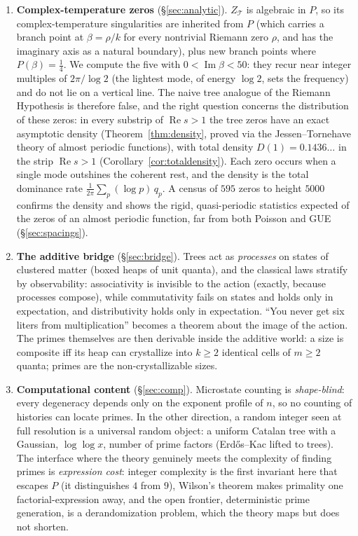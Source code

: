 \documentclass[11pt]{article}
\newcommand{\cT}{\mathcal{T}}   %
\numberwithin{equation}{section}
\theoremstyle{plain}
\theoremstyle{definition}
\theoremstyle{remark}
\begin{document}
\begin{enumerate}
\item \textbf{Complex-temperature zeros} (\S\ref{sec:analytic}). $Z_\cT$ is algebraic
in $P$, so its complex-temperature singularities are inherited from $P$ (which
carries a branch point at $\beta = \rho/k$ for every nontrivial Riemann zero $\rho$,
and has the imaginary axis as a natural boundary), plus new branch points where
$P(\beta) = \tfrac14$. We compute the five with $0 < \operatorname{Im}\beta < 50$:
they recur near integer multiples of $2\pi/\log 2$ (the lightest mode, of energy
$\log 2$, sets the frequency) and do not
lie on a vertical line. The naive tree analogue of the Riemann Hypothesis is
therefore false, and the right question concerns the distribution of these zeros: in
every substrip of $\operatorname{Re} s > 1$ the tree zeros
have an exact asymptotic density (Theorem~\ref{thm:density}, proved via the
Jessen--Tornehave theory of almost periodic functions), with total density
$D(1) = 0.1436\dots$ in the strip $\operatorname{Re} s > 1$
(Corollary~\ref{cor:totaldensity}). Each zero occurs when a single mode outshines the
coherent rest, and the density is the total dominance rate
$\frac{1}{2\pi}\sum_p (\log p)\, q_p$. A census of $595$ zeros to height $5000$
confirms the density and shows the rigid, quasi-periodic statistics expected of
the zeros of an almost periodic function, far from both Poisson and GUE
(\S\ref{sec:spacings}).

\item \textbf{The additive bridge} (\S\ref{sec:bridge}). Trees act as
\emph{processes} on states of clustered matter (boxed heaps of unit quanta), and the
classical laws stratify by observability: associativity is invisible to the action
(exactly, because processes compose), while commutativity fails on states and
holds only in expectation, and distributivity holds only in expectation. ``You never
get six liters from multiplication'' becomes a theorem about the image of the action.
The primes themselves are then derivable inside the additive world: a size is
composite iff its heap can crystallize into $k \ge 2$ identical cells of $m \ge 2$
quanta; primes are the non-crystallizable sizes.

\item \textbf{Computational content} (\S\ref{sec:comp}). Microstate counting is
\emph{shape-blind}: every
degeneracy depends only on the exponent profile of $n$, so no counting of histories
can locate primes. In the other direction, a
random integer seen at full resolution is a universal random object: a uniform
Catalan tree with a Gaussian, $\log\log x$, number of prime factors (Erd\H{o}s--Kac
lifted to trees). The interface where the theory genuinely meets the complexity of
finding primes is \emph{expression cost}: integer complexity is the first invariant
here that escapes $P$ (it distinguishes $4$ from $9$), Wilson's theorem makes
primality one factorial-expression away, and the open frontier, deterministic
prime generation, is a derandomization problem, which the theory maps but does not
shorten.
\end{enumerate}
\end{document}
